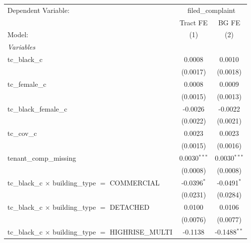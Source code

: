 \begin{tabular}{lcc}
   \tabularnewline \midrule \midrule
   Dependent Variable: & \multicolumn{2}{c}{filed\_complaint}\\
                                                                       & Tract FE       & BG FE \\   
   Model:                                                              & (1)            & (2)\\  
   \midrule
   \emph{Variables}\\
   tc\_black\_c                                                        & 0.0008         & 0.0010\\   
                                                                       & (0.0017)       & (0.0018)\\   
   tc\_female\_c                                                       & 0.0008         & 0.0009\\   
                                                                       & (0.0015)       & (0.0013)\\   
   tc\_black\_female\_c                                                & -0.0026        & -0.0022\\   
                                                                       & (0.0022)       & (0.0021)\\   
   tc\_cov\_c                                                          & 0.0023         & 0.0023\\   
                                                                       & (0.0015)       & (0.0016)\\   
   tenant\_comp\_missing                                               & 0.0030$^{***}$ & 0.0030$^{***}$\\   
                                                                       & (0.0008)       & (0.0008)\\   
   tc\_black\_c $\times$ building\_type $=$ COMMERCIAL                 & -0.0396$^{*}$  & -0.0491$^{*}$\\   
                                                                       & (0.0231)       & (0.0284)\\   
   tc\_black\_c $\times$ building\_type $=$ DETACHED                   & 0.0100         & 0.0106\\   
                                                                       & (0.0076)       & (0.0077)\\   
   tc\_black\_c $\times$ building\_type $=$ HIGHRISE\_MULTI            & -0.1138        & -0.1488$^{**}$\\   

\end{tabular}
